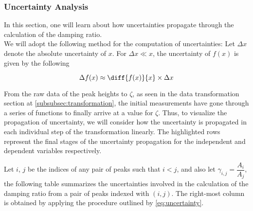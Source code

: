 \documentclass[a4paper,12pt]{article}
\newcommand{\lb}{\\[12pt]}
\begin{document}
\pagebreak

\subsubsection{Uncertainty Analysis}

In this section, one will learn about how uncertainties propagate through the calculation of the damping ratio.\lb
We will adopt the following method for the computation of uncertainties: Let $\Delta x$ denote the absolute uncertainty of $x$. For $\Delta x \ll x$, the uncertainty of $f(x)$ is given by the following \parencite{vacher_2001_the}

\begin{equation}\label{eq:uncertainty}
  \Delta f(x) \approx \diff{f(x)}{x}\times \Delta x
\end{equation}

From the raw data of the peak heights to $\zeta$, as seen in the data transformation section at \cref{subsubsec:transformation}, the initial measurements have gone through a series of functions to finally arrive at a value for $\zeta$. Thus, to visualize the propagation of uncertainty, we will consider how the uncertainty is propagated in each individual step of the transformation linearly. The highlighted rows represent the final stages of the uncertainty propagation for the independent and dependent variables respectively.


Let $i$, $j$ be the indices of any pair of peaks such that $i < j$, and also let $\gamma_{i, j} = \dfrac{A_i}{A_{j}}$, the following table summarizes the uncertainties involved in the calculation of the damping ratio from a pair of peaks indexed with $(i, j)$. The right-most column is obtained by applying the procedure outlined by \cref{eq:uncertainty}.
\end{document}

